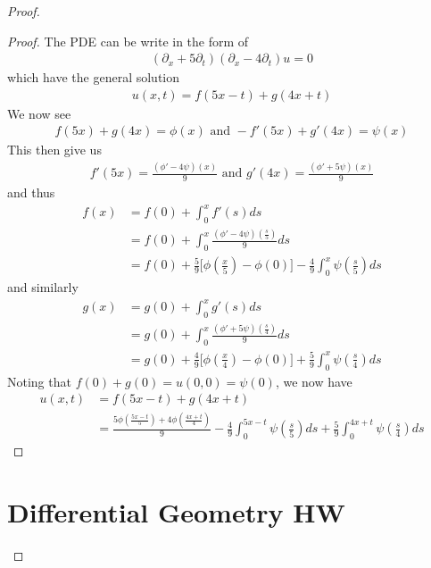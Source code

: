 \documentclass{report}
\begin{document}
\begin{proof}
\begin{question}{}{}
\end{question}
\begin{proof}
The PDE can be write in the form of 
\begin{align*}
  (\partial_x + 5\partial_t) (\partial_x - 4 \partial _t)u=0
\end{align*}
which have the general solution 
\begin{align*}
u(x,t)=f(5x-t)+g(4x+t)
\end{align*}
We now see 
\begin{align*}
f(5x)+g(4x)=\phi (x)\text{ and }-f'(5x)+g'(4x)=\psi (x)
\end{align*}
This then give us 
\begin{align*}
f'(5x)=\frac{(\phi' - 4\psi)(x)}{9}\text{ and }g'(4x)= \frac{(\phi '+5\psi )(x)}{9}
\end{align*}
and thus 
\begin{align*}
f(x)&=f(0)+ \int_0^x f'(s)ds\\
&=f(0)+\int_0^x \frac{(\phi' -4\psi)(\frac{s}{5})}{9}ds \\
&=f(0)+ \frac{5}{9}\Big[\phi (\frac{x}{5})-\phi (0) \Big] - \frac{4}{9}\int_0^x \psi (\frac{s}{5})ds
\end{align*}
and similarly 
\begin{align*}
g(x)&=g(0)+\int_0^x g'(s)ds \\
&=g(0)+ \int_0^x \frac{(\phi ' +5 \psi )(\frac{s}{4})}{9}ds \\
&=g(0)+ \frac{4}{9}\Big[ \phi (\frac{x}{4})- \phi (0) \Big]+\frac{5}{9} \int_0^x \psi (\frac{s}{4})ds
\end{align*}
Noting that $f(0)+g(0)=u(0,0)=\psi (0)$, we now have
\begin{align*}
u(x,t)&=f(5x-t)+g(4x+t) \\
&=\frac{5\phi (\frac{5x-t}{5})+4 \phi (\frac{4x+t}{4})}{9} - \frac{4}{9}\int_0^{5x-t}\psi (\frac{s}{5})ds + \frac{5}{9}\int_0^{4x+t}\psi (\frac{s}{4})ds
\end{align*}
\end{proof}
\chapter{Differential Geometry HW} 

\end{proof}
\end{document}
